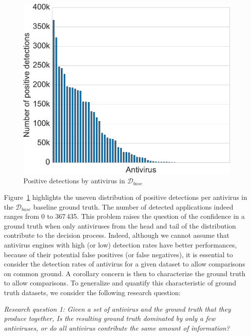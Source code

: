 \begin{figure}[!ht]
        \centering
	\includegraphics[width=0.75\linewidth]{figures/stase/equiponderance.pdf}
        \caption[Positive detections by antivirus]{Positive detections by antivirus in $\mathcal{D}_{base}$}
	\label{figure:stase:equiponderance}
\end{figure}

Figure~\ref{figure:stase:equiponderance} highlights the uneven distribution of positive detections per antivirus in the $\mathcal{D}_{base}$ baseline ground truth.
The number of detected applications indeed ranges from 0 to 367\,435.
This problem raises the question of the confidence in a ground truth when only antiviruses from the head and tail of the distribution contribute to the decision process.
Indeed, although we cannot assume that antivirus engines with high (or low) detection rates have better performances, because of their potential false positives (or false negatives), it is essential to consider the detection rates of antivirus for a given dataset to allow comparisons on common ground.
A corollary concern is then to characterize the ground truth to allow comparisons.
To generalize and quantify this characteristic of ground truth datasets, we consider the following research question:

\begin{mdframed}[roundcorner=10pt,nobreak=true]
	{\em Research question 1: Given a set of antivirus and the ground truth that they produce together, Is the resulting ground truth dominated by only a few antiviruses, or do all antivirus contribute the same amount of information?}
\end{mdframed}

